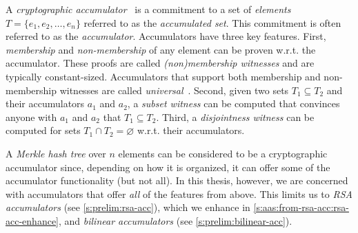 A \textit{cryptographic accumulator}~\cite{acc-rsa,Nguyen05} is a commitment to a set of \textit{elements} $T = \{e_1, e_2, \dots, e_n\}$ referred to as the \textit{accumulated set}.
This commitment is often referred to as the \textit{accumulator}.
Accumulators have three key features.
First, \textit{membership} and \textit{non-membership} of any element can be proven w.r.t. the accumulator.
These proofs are called \textit{(non)membership witnesses} and are typically constant-sized.
Accumulators that support both membership and non-membership witnesses are called \textit{universal}~\cite{LLX07}.
Second, given two sets $T_1 \subseteq T_2$ and their accumulators $a_1$ and $a_2$, a \textit{subset witness} can be computed that convinces anyone with $a_1$ and $a_2$ that $T_1 \subseteq T_2$.
Third, a \textit{disjointness witness} can be computed for sets $T_1 \cap T_2 = \varnothing$ w.r.t. their accumulators.

A \textit{Merkle hash tree} over $n$ elements can be considered to be a cryptographic accumulator since, depending on how it is organized, it can offer some of the accumulator functionality (but not all).
In this thesis, however, we are concerned with accumulators that offer \textit{all} of the features from above.
This limits us to \textit{RSA accumulators} (see \cref{s:prelim:rsa-acc}), which we enhance in \cref{s:aas:from-rsa-acc:rsa-acc-enhance}, and \textit{bilinear accumulators} (see \cref{s:prelim:bilinear-acc}).